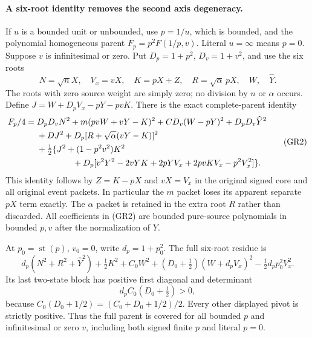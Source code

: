 \paragraph{A six-root identity removes the second axis degeneracy.}
If $u$ is a bounded unit or unbounded, use $p=1/u$, which is
bounded, and the polynomial homogeneous parent $F_p=p^2F(1/p,v)$.
Literal $u=\infty$ means $p=0$. Suppose $v$ is infinitesimal or zero.
Put $D_p=1+p^2$, $D_v=1+v^2$, and use the six roots
\[
 N=\sqrt n X,\quad V_x=vX,\quad K=pX+Z,\quad
 R=\sqrt\alpha\,pX,\quad W,\quad\widehat Y.
\]
The roots with zero source weight are simply zero; no division by
$n$ or $\alpha$ occurs. Define $J=W+D_pV_x-pY-pvK$.
There is the exact complete-parent identity
\[
\begin{split}
 F_p/4={}&D_pD_vN^2+m(pvW+vY-K)^2+C D_v(W-pY)^2
                         +D_pD_v\widehat Y^2\\
 &+DJ^2+D_p[R+\sqrt\alpha(vY-K)]^2\\
 &+\tfrac12\{J^2+(1-p^2v^2)K^2\\
 &\hspace{15mm}+D_p[v^2Y^2-2vYK+2pYV_x+2pvKV_x-p^2V_x^2]\}.
\end{split}                                                   \tag{GR2}
\]
This identity follows by $Z=K-pX$ and $vX=V_x$ in the original
signed core and all original event packets. In particular the $m$
packet loses its apparent separate $pX$ term exactly. The $\alpha$
packet is retained in the extra root $R$ rather than discarded.
All coefficients in (GR2) are bounded pure-source polynomials in
bounded $p,v$ after the normalization of $Y$.

At $p_0=\operatorname{st}(p)$, $v_0=0$, write $d_p=1+p_0^2$.
The full six-root residue is
\[
 d_p(N^2+R^2+\widehat Y^2)+\tfrac12K^2
 +C_0W^2+(D_0+\tfrac12)(W+d_pV_x)^2
                  -\tfrac12d_pp_0^2V_x^2.            \tag{GR3}
\]
Its last two-state block has positive first diagonal and determinant
\[
 d_p C_0(D_0+\tfrac12)>0,                            \tag{GR4}
\]
because $C_0(D_0+1/2)=(C_0+D_0+1/2)/2$.
Every other displayed pivot is strictly positive. Thus the full
parent is covered for all bounded $p$ and infinitesimal or zero $v$,
including both signed finite $p$ and literal $p=0$.

